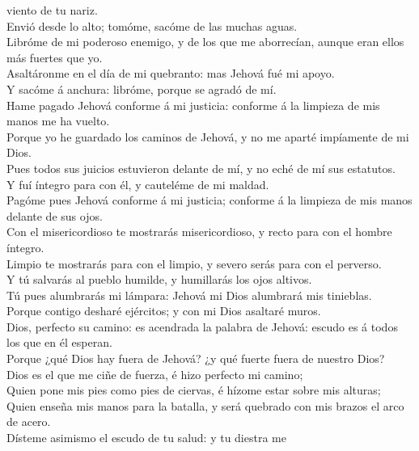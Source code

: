 viento de tu nariz.\\
 Envió desde lo alto; tomóme, sacóme de las muchas aguas.\\
 Libróme de mi poderoso enemigo, y de los que me
aborrecían, aunque eran ellos más fuertes que yo.\\
 Asaltáronme en el día de mi quebranto: mas Jehová fué mi
apoyo.\\
 Y sacóme á anchura: libróme, porque se agradó de mí.\\
 Hame pagado Jehová conforme á mi justicia: conforme á la
limpieza de mis manos me ha vuelto.\\
 Porque yo he guardado los caminos de Jehová, y no me
aparté impíamente de mi Dios.\\
 Pues todos sus juicios estuvieron delante de mí, y no eché
de mí sus estatutos.\\
 Y fuí íntegro para con él, y cauteléme de mi maldad.\\
 Pagóme pues Jehová conforme á mi justicia; conforme á la
limpieza de mis manos delante de sus ojos.\\
 Con el misericordioso te mostrarás misericordioso, y recto
para con el hombre íntegro.\\
 Limpio te mostrarás para con el limpio, y severo serás
para con el perverso.\\
 Y tú salvarás al pueblo humilde, y humillarás los ojos
altivos.\\
 Tú pues alumbrarás mi lámpara: Jehová mi Dios alumbrará
mis tinieblas.\\
 Porque contigo desharé ejércitos; y con mi Dios asaltaré
muros.\\
 Dios, perfecto su camino: es acendrada la palabra de
Jehová: escudo es á todos los que en él esperan.\\
 Porque ¿qué Dios hay fuera de Jehová? ¿y qué fuerte fuera
de nuestro Dios?\\
 Dios es el que me ciñe de fuerza, é hizo perfecto mi
camino;\\
 Quien pone mis pies como pies de ciervas, é hízome estar
sobre mis alturas;\\
 Quien enseña mis manos para la batalla, y será quebrado
con mis brazos el arco de acero.\\
 Dísteme asimismo el escudo de tu salud: y tu diestra me
